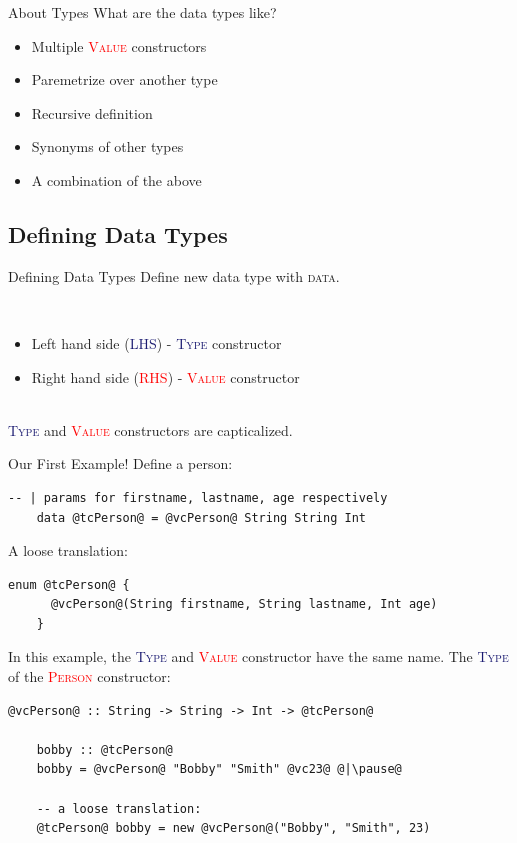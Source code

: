 \documentclass[xcolor={usenames,dvipsnames}]{beamer}
\newcommand{\hkeyword}[1]{\textcolor{TealBlue}{\textsc{#1}}}
\newcommand{\htycon}[1]{\textcolor{MidnightBlue}{\textsc{#1}}}
\newcommand{\hvalcon}[1]{\textcolor{Red}{\textsc{#1}}}
\begin{document}
\begin{frame}[fragile]{About Types}
  What are the data types like?
  \pause
  \begin{itemize}
    \item Multiple \hvalcon{Value} constructors
    \pause
    \item Paremetrize over another type
    \pause
    \item Recursive definition
    \pause
    \item Synonyms of other types
    \pause
    \item A combination of the above
  \end{itemize}
\end{frame}

\subsection{Defining Data Types}
\begin{frame}[fragile]{Defining Data Types}
  Define new data type with \hkeyword{data}.

  \pause
  \ \\
  \begin{itemize}
    \item Left hand side (\htycon{LHS}) - \htycon{Type} constructor
    \item Right hand side (\hvalcon{RHS}) - \hvalcon{Value} constructor
  \end{itemize}

  \pause
  \ \\
  \htycon{Type} and \hvalcon{Value} constructors are capticalized.
\end{frame}

\begin{frame}[fragile]{Our First Example!}
  Define a person:
  \begin{lstlisting}[style=hask]
    -- | params for firstname, lastname, age respectively
    data @tcPerson@ = @vcPerson@ String String Int
  \end{lstlisting}

  \pause
  A loose translation:
  \begin{lstlisting}[style=hask]
    enum @tcPerson@ {
      @vcPerson@(String firstname, String lastname, Int age)
    }
  \end{lstlisting}

  \pause
  In this example, the \htycon{Type} and \hvalcon{Value} constructor have the same name. The \htycon{Type} of the \hvalcon{Person} constructor:
  \begin{lstlisting}[style=hask]
    @vcPerson@ :: String -> String -> Int -> @tcPerson@

    bobby :: @tcPerson@
    bobby = @vcPerson@ "Bobby" "Smith" @vc23@ @|\pause@

    -- a loose translation:
    @tcPerson@ bobby = new @vcPerson@("Bobby", "Smith", 23)
  \end{lstlisting}
\end{frame}
\end{document}
